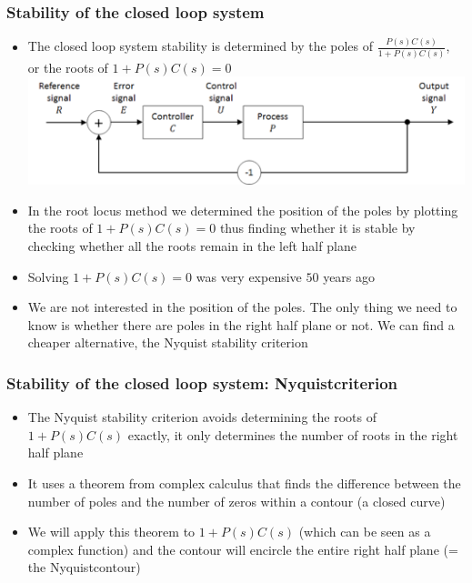 \begin{frame}
\frametitle{Stability of the closed loop system}
\begin{itemize}
\item The closed loop system stability is determined by the poles of $\frac{P(s)C(s)}{1+P(s)C(s)}$, or the roots of $1+P(s)C(s)=0$
\includegraphics{Afbeelding1}
\item In the root locus method we determined the position of the poles by plotting the roots of $1+P(s)C(s)=0 $ thus finding whether it is stable by checking whether all the roots remain in the left half plane
\item Solving $1+P(s)C(s)=0$ was very expensive $50$ years ago
\item We are not interested in the position of the poles. The only thing we need to know is whether there are poles in the right half plane or not. We can find a cheaper alternative, the Nyquist stability criterion
\end{itemize}
\end{frame}

\begin{frame}
\frametitle{Stability of the closed loop system: Nyquistcriterion}
\begin{itemize}
\item The Nyquist stability criterion avoids determining the roots of $1+P(s)C(s)$ exactly, it only determines the number of roots in the right half plane
\item It uses a theorem from complex calculus that finds the difference between the number of poles and the number of zeros within a contour (a closed curve)
\item We will apply this theorem to $1+P(s)C(s)$ (which can be seen as a complex function) and the contour will encircle the entire right half plane (= the Nyquistcontour)
\end{itemize}
\end{frame}

